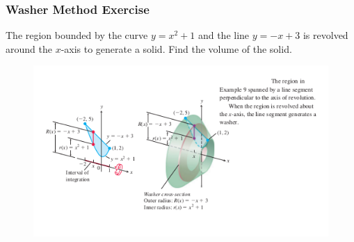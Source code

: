 \documentclass[xcolor=dvipsnames]{beamer}
\begin{document}
\begin{frame}
  \frametitle{Washer Method Exercise}
{\ubung} The region bounded by the curve $y=x^{2}+1$ and the line
$y=-x+3$ is revolved around the $x$-axis to generate a solid. Find the
volume of the solid.
\begin{figure}[h]
  \includegraphics[scale=0.65]{./diagrams/washer.png}
\end{figure}
\end{frame}
\end{document}
